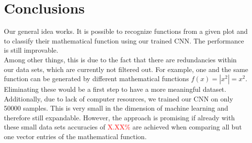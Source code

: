\documentclass[11pt,a4paper]{scrartcl}
\begin{document}
	\section{Conclusions}
	Our general idea works. It is possible to recognize functions from a given plot and to classify their mathematical function using our trained CNN. The performance is still improvable.\\
	Among other things, this is due to the fact that there are redundancies within our data sets, which are currently not filtered out. For example, one and the same function can be generated by different mathematical functions \(f(x) = |x^2| = x^2\). Eliminating these would be a first step to have a more meaningful dataset.\\
	Additionally, due to lack of computer resources, we trained our CNN on only 50000 samples. This is very small in the dimension of machine learning and therefore still expandable. However, the approach is promising if already with these small data sets accuracies of \textcolor{red}{X.XX\%} are achieved when comparing all but one vector entries of the mathematical function. 
\end{document}
